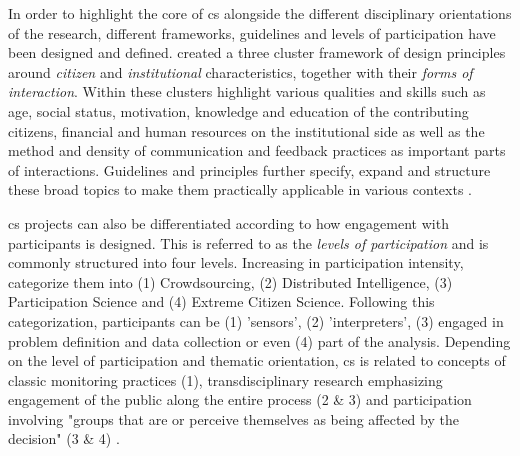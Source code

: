 In order to highlight the core of \acrshort{cs} alongside the different disciplinary orientations of the research, different frameworks, guidelines and levels of participation have been designed and defined. \Textcite{kirschkeCitizenScienceProjects2022} created a three cluster framework of design principles around \textit{citizen} and \textit{institutional} characteristics, together with their \textit{forms of interaction}. Within these clusters \textcite{kirschkeCitizenScienceProjects2022} highlight various qualities and skills such as age, social status, motivation, knowledge and education of the contributing citizens, financial and human resources on the institutional side as well as the method and density of communication and feedback practices as important parts of interactions. Guidelines and principles further specify, expand and structure these broad topics to make them practically applicable in various contexts \autocite{citizenscience.govBasicStepsYour,escaTenPrinciplesCitizen2015,escaECSACharacteristicsCitizen2020,eu-citizen.scienceEUCitizenScience,fraislCitizenScienceEnvironmental2022,garciaFindingWhatYou2021,pocockStrategicFrameworkSupport2014,skarlatidouWhatVolunteersWant2019}.

\acrlong{cs} projects can also be differentiated according to how engagement with participants is designed. This is referred to as the \textit{levels of participation} and is commonly structured into four levels. Increasing in participation intensity, \textcite{buckinghamshumGlobalParticipatoryPlatform2012} categorize them into (1) Crowdsourcing, (2) Distributed Intelligence, (3) Participation Science and (4) Extreme Citizen Science. Following this categorization, participants can be (1) 'sensors', (2) 'interpreters', (3) engaged in problem definition and data collection or even (4) part of the analysis.\newline
Depending on the level of participation and thematic orientation, \acrshort{cs} is related to concepts of classic monitoring practices (1), transdisciplinary research emphasizing engagement of the public along the entire process (2 \& 3) and participation involving "groups that are or perceive themselves as being affected by the decision" \autocites[1]{rennParticipatoryProcessesDesigning2006} (3 \& 4) \autocites{buckinghamshumGlobalParticipatoryPlatform2012,conradReviewCitizenScience2011,minkmanCitizenScienceWater2015}.

